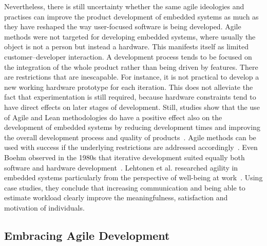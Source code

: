 \documentclass[english]{tktltiki2}
\begin{document}
Nevertheless, there is still uncertainty whether the same agile ideologies and practises can improve the product development of embedded systems as much as they have reshaped the way user-focused software is being developed. Agile methods were not targeted for developing embedded systems, where usually the object is not a person but instead a hardware. This manifests itself as limited customer–developer interaction. A development process tends to be focused on the integration of the whole product rather than being driven by features. There are restrictions that are inescapable. For instance, it is not practical to develop a new working hardware prototype for each iteration. This does not alleviate the fact that experimentation is still required, because hardware constraints tend to have direct effects on later stages of development. Still, studies show that the use of Agile and Lean methodologies do have a positive effect also on the development of embedded systems by reducing development times and improving the overall development process and quality of products~\cite{CWR10, KRM13}. Agile methods can be used with success if the underlying restrictions are addressed accordingly~\cite{RA03}. Even Boehm observed in the 1980s that iterative development suited equally both software and hardware development~\cite{Boe88}. Lehtonen et al. researched agility in embedded systems particularly from the perspective of well-being at work~\cite{LTR14}. Using case studies, they conclude that increasing communication and being able to estimate workload clearly improve the meaningfulness, satisfaction and motivation of individuals.

\subsection{Embracing Agile Development}
\end{document}
